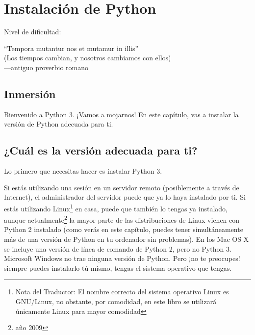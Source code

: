 
\chapter{Instalación de Python}\label{ch:instalacion}

\noindent
Nivel de dificultad:\difl

\begin{citaCap}
``Tempora mutantur nos et mutamur in illis''\\
(Los tiempos cambian, y nosotros cambiamos con ellos)\\
---antiguo proverbio romano
\end{citaCap}

\section{Inmersión}

Bienvenido a Python 3. ¡Vamos a mojarnos! En este capítulo, vas a instalar la versión de Python adecuada para ti.

\section{¿Cuál es la versión adecuada para ti?}

Lo primero que necesitas hacer es instalar Python 3.

Si estás utilizando una sesión en un servidor remoto (posiblemente a través de Internet), el administrador del servidor puede que ya lo haya instalado por ti. Si estás utilizando Linux\footnote{Nota del Traductor: El nombre correcto del sistema operativo Linux es GNU/Linux, no obstante, por comodidad, en este libro se utilizará únicamente Linux para mayor comodidad} en casa, puede que también lo tengas ya instalado, aunque actualmente\footnote{año 2009} la mayor parte de las distribuciones de Linux vienen con Python 2 instalado (como verás en este capítulo, puedes tener simultáneamente más de una versión de Python en tu ordenador sin problemas). En los Mac OS X se incluye una versión de línea de comando de Python 2, pero no Python 3. Microsoft Windows no trae ninguna versión de Python. Pero ¡no te preocupes! siempre puedes instalarlo tú mismo, tengas el sistema operativo que tengas.

